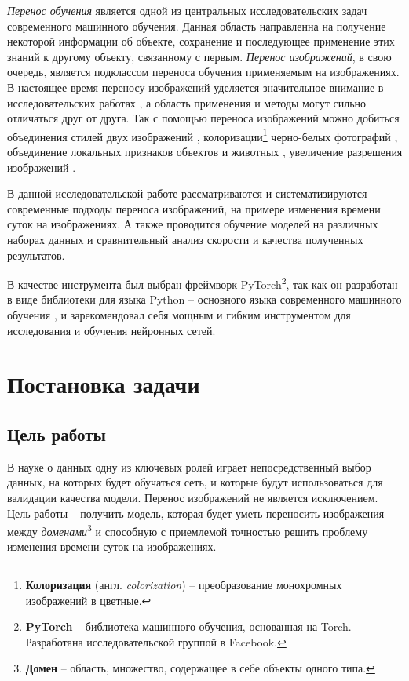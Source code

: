 \documentclass[11pt,a4paper]{extarticle}
\begin{document}
	\textit{Перенос обучения} является одной из центральных исследовательских задач современного машинного обучения.
	Данная область направленна на получение некоторой информации об объекте, сохранение и последующее применение этих знаний к другому объекту, связанному с первым.   
	\textit{Перенос изображений}, в свою очередь, является подклассом переноса обучения применяемым на изображениях. 
	В настоящее время переносу изображений уделяется значительное внимание в исследовательских работах \cite{i2ipapers},
	а область применения и методы могут сильно отличаться друг от друга.
	Так с помощью переноса изображений можно добиться объединения стилей двух изображений \cite{style_transfer},
	колоризации\footnote{
		\textbf{Колоризация} (англ. \textit{colorization}) -- преобразование монохромных изображений в цветные.
	} черно-белых фотографий \cite{color_transfer}, объединение локальных признаков объектов и животных \cite{CycleGAN},
	увеличение разрешения изображений \cite{super_resolution}.

	В данной исследовательской работе рассматриваются и систематизируются современные подходы переноса изображений, на примере изменения времени суток на изображениях.
	А также проводится обучение моделей на различных наборах данных и сравнительный анализ скорости и качества полученных результатов.
	
	В качестве инструмента был выбран фреймворк PyTorch\footnote{
		\textbf{PyTorch} -- библиотека машинного обучения, основанная на Torch. Разработана исследовательской группой в Facebook.
	}, так как он разработан в виде библиотеки для языка Python -- основного языка современного машинного обучения \cite{ml_lang},
	и зарекомендовал себя мощным и гибким инструментом для исследования и обучения нейронных сетей.

\newpage
\section{Постановка задачи}
	\subsection{Цель работы}
		В науке о данных одну из ключевых ролей играет непосредственный выбор данных, на которых будет обучаться сеть, 
		и которые будут использоваться для валидации качества модели. Перенос изображений не является исключением.
		Цель работы -- получить модель, которая будет уметь переносить изображения между \textit{доменами}\footnote{
			\textbf{Домен} -- область, множество, содержащее в себе объекты одного типа. 
		} и способную с приемлемой точностью решить проблему изменения времени суток на изображениях.
	
\end{document}

